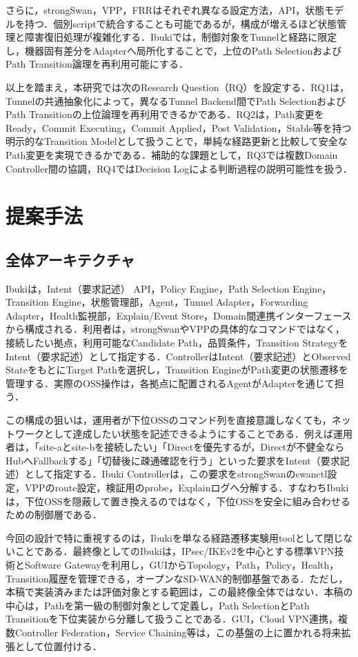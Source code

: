 \documentclass[11pt,a4paper,twoside]{ltjsarticle}
\begin{document}
さらに，strongSwan，VPP，FRRはそれぞれ異なる設定方法，API，状態モデルを持つ．個別scriptで統合することも可能であるが，構成が増えるほど状態管理と障害復旧処理が複雑化する．Ibukiでは，制御対象をTunnelと経路に限定し，機器固有差分をAdapterへ局所化することで，上位のPath SelectionおよびPath Transition論理を再利用可能にする．

以上を踏まえ，本研究では次のResearch Question（RQ）を設定する．RQ1は，Tunnelの共通抽象化によって，異なるTunnel Backend間でPath SelectionおよびPath Transitionの上位論理を再利用できるかである．RQ2は，Path変更をReady，Commit Executing，Commit Applied，Post Validation，Stable等を持つ明示的なTransition Modelとして扱うことで，単純な経路更新と比較して安全なPath変更を実現できるかである．補助的な課題として，RQ3では複数Domain Controller間の協調，RQ4ではDecision Logによる判断過程の説明可能性を扱う．

\section{提案手法}
\subsection{全体アーキテクチャ}
Ibukiは，Intent（要求記述） API，Policy Engine，Path Selection Engine，Transition Engine，状態管理部，Agent，Tunnel Adapter，Forwarding Adapter，Health監視部，Explain/Event Store，Domain間連携インターフェースから構成される．利用者は，strongSwanやVPPの具体的なコマンドではなく，接続したい拠点，利用可能なCandidate Path，品質条件，Transition StrategyをIntent（要求記述）として指定する．ControllerはIntent（要求記述）とObserved StateをもとにTarget Pathを選択し，Transition EngineがPath変更の状態遷移を管理する．実際のOSS操作は，各拠点に配置されるAgentがAdapterを通じて担う．

この構成の狙いは，運用者が下位OSSのコマンド列を直接意識しなくても，ネットワークとして達成したい状態を記述できるようにすることである．例えば運用者は，「site-aとsite-bを接続したい」「Directを優先するが，Directが不健全ならHubへFallbackする」「切替後に疎通確認を行う」といった要求をIntent（要求記述）として指定する．Ibuki Controllerは，この要求をstrongSwanのswanctl設定，VPPのroute設定，検証用のprobe，Explainログへ分解する．すなわちIbukiは，下位OSSを隠蔽して置き換えるのではなく，下位OSSを安全に組み合わせるための制御層である．

今回の設計で特に重視するのは，Ibukiを単なる経路遷移実験用toolとして閉じないことである．最終像としてのIbukiは，IPsec/IKEv2を中心とする標準VPN技術とSoftware Gatewayを利用し，GUIからTopology，Path，Policy，Health，Transition履歴を管理できる，オープンなSD-WAN的制御基盤である．ただし，本稿で実装済みまたは評価対象とする範囲は，この最終像全体ではない．本稿の中心は，Pathを第一級の制御対象として定義し，Path SelectionとPath Transitionを下位実装から分離して扱うことである．GUI，Cloud VPN連携，複数Controller Federation，Service Chaining等は，この基盤の上に置かれる将来拡張として位置付ける．
\end{document}
